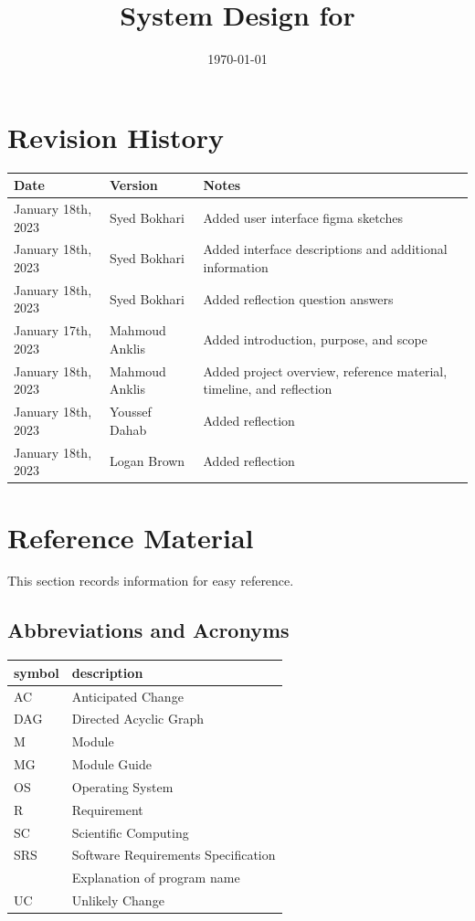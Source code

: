 \documentclass[12pt, titlepage]{article}
\begin{document}
\title{System Design for \progname{}} 
\author{\authname}
\date{\today}

\maketitle


\section{Revision History}

\begin{tabularx}{\textwidth}{p{3cm}p{2cm}X}
	\toprule {\bf Date} & {\bf Version} & {\bf Notes}\\
	\midrule
	January 18th, 2023 & Syed Bokhari & Added user interface figma sketches\\
	January 18th, 2023 & Syed Bokhari & Added interface descriptions and additional information\\
	January 18th, 2023 & Syed Bokhari & Added reflection question answers\\
	January 17th, 2023 & Mahmoud Anklis & Added introduction, purpose, and scope\\
	January 18th, 2023 & Mahmoud Anklis & Added project overview, reference material, timeline, and reflection\\
	January 18th, 2023 & Youssef Dahab & Added reflection\\
  January 18th, 2023 & Logan Brown & Added reflection\\
	\bottomrule
\end{tabularx}

\newpage

\section{Reference Material}

This section records information for easy reference.

\subsection{Abbreviations and Acronyms}

\renewcommand{\arraystretch}{1.2}
\begin{tabular}{l l} 
	\toprule		
	\textbf{symbol} & \textbf{description}\\
	\midrule 
	AC & Anticipated Change\\
	DAG & Directed Acyclic Graph \\
	M & Module \\
	MG & Module Guide \\
	OS & Operating System \\
	R & Requirement\\
	SC & Scientific Computing \\
	SRS & Software Requirements Specification\\
	\progname & Explanation of program name\\
	UC & Unlikely Change \\
	\bottomrule
\end{tabular}\\
\end{document}
